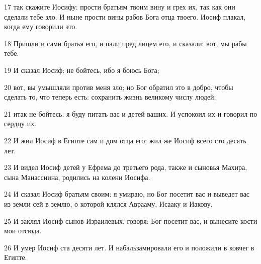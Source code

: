 \par 17 так скажите Иосифу: прости братьям твоим вину и грех их, так как они сделали тебе зло. И ныне прости вины рабов Бога отца твоего. Иосиф плакал, когда ему говорили это.
\par 18 Пришли и сами братья его, и пали пред лицем его, и сказали: вот, мы рабы тебе.
\par 19 И сказал Иосиф: не бойтесь, ибо я боюсь Бога;
\par 20 вот, вы умышляли против меня зло; но Бог обратил это в добро, чтобы сделать то, что теперь есть: сохранить жизнь великому числу людей;
\par 21 итак не бойтесь: я буду питать вас и детей ваших. И успокоил их и говорил по сердцу их.
\par 22 И жил Иосиф в Египте сам и дом отца его; жил же Иосиф всего сто десять лет.
\par 23 И видел Иосиф детей у Ефрема до третьего рода, также и сыновья Махира, сына Манассиина, родились на колени Иосифа.
\par 24 И сказал Иосиф братьям своим: я умираю, но Бог посетит вас и выведет вас из земли сей в землю, о которой клялся Аврааму, Исааку и Иакову.
\par 25 И заклял Иосиф сынов Израилевых, говоря: Бог посетит вас, и вынесите кости мои отсюда.
\par 26 И умер Иосиф ста десяти лет. И набальзамировали его и положили в ковчег в Египте.


